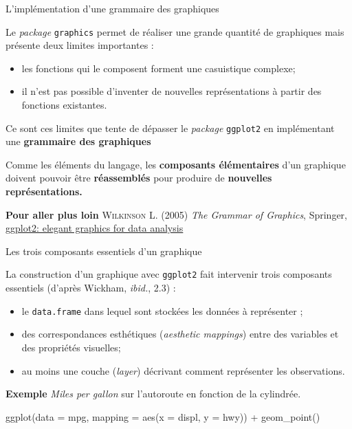 \documentclass[12pt,ignorenonframetext,]{beamer}
\newenvironment{Shaded}{}{}
\newcommand{\KeywordTok}[1]{\textcolor[rgb]{0.00,0.00,1.00}{#1}}
\newcommand{\DataTypeTok}[1]{#1}
\newcommand{\StringTok}[1]{\textcolor[rgb]{0.00,0.50,0.50}{#1}}
\newcommand{\OperatorTok}[1]{#1}
\newcommand{\NormalTok}[1]{#1}
\providecommand{\tightlist}{%
  \setlength{\itemsep}{0pt}\setlength{\parskip}{0pt}}
\renewenvironment{Shaded}{\begin{snugshade}}{\end{snugshade}}
\begin{document}
\begin{frame}[fragile]{\large L'implémentation d'une grammaire des
graphiques}

Le \emph{package} \texttt{graphics} permet de réaliser une grande
quantité de graphiques mais présente deux limites importantes :

\begin{itemize}
\tightlist
\item
  les fonctions qui le composent forment une casuistique complexe;
\item
  il n'est pas possible d'inventer de nouvelles représentations à partir
  des fonctions existantes.
\end{itemize}

\pause Ce sont ces limites que tente de dépasser le \emph{package}
\texttt{ggplot2} en implémentant une \textbf{grammaire des graphiques}

Comme les éléments du langage, les \textbf{composants élémentaires} d'un
graphique doivent pouvoir être \textbf{réassemblés} pour produire de
\textbf{nouvelles représentations.}

\pause 

\textbf{Pour aller plus loin} \textsc{Wilkinson L.} (2005)
\textit{The Grammar of Graphics}, Springer,
\href{https://github.com/hadley/ggplot2-book}{\underline{ggplot2: elegant graphics for data analysis}}

\end{frame}

\begin{frame}[fragile]{\large Les trois composants essentiels d'un
graphique}

La construction d'un graphique avec \texttt{ggplot2} fait intervenir
trois composants essentiels (d'après Wickham, \emph{ibid.}, 2.3) :

\begin{itemize}
\tightlist
\item
  le \texttt{data.frame} dans lequel sont stockées les données à
  représenter ;
\item
  des correspondances esthétiques (\emph{aesthetic mappings}) entre des
  variables et des propriétés visuelles;
\item
  au moins une couche (\emph{layer}) décrivant comment représenter les
  observations.
\end{itemize}

\pause 

\textbf{Exemple} \emph{Miles per gallon} sur l'autoroute en fonction de
la cylindrée.

\center \small 

\begin{Shaded}
\begin{Highlighting}[]
\KeywordTok{ggplot}\NormalTok{(}\DataTypeTok{data =}\NormalTok{ mpg, }\DataTypeTok{mapping =} \KeywordTok{aes}\NormalTok{(}\DataTypeTok{x =}\NormalTok{ displ, }\DataTypeTok{y =}\NormalTok{ hwy)) }\OperatorTok{+}
\StringTok{  }\KeywordTok{geom_point}\NormalTok{()}
\end{Highlighting}
\end{Shaded}

\end{frame}
\end{document}
